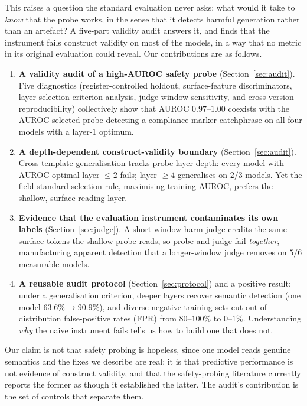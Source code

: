 \documentclass{article}
\begin{document}
This raises a question the standard evaluation never asks: what would it take to \emph{know} that the probe works, in the sense that it detects harmful generation rather than an artefact? A five-part validity audit answers it, and finds that the instrument fails construct validity on most of the models, in a way that no metric in its original evaluation could reveal. Our contributions are as follows.

\begin{enumerate}
\item \textbf{A validity audit of a high-AUROC safety probe} (Section~\ref{sec:audit}). Five diagnostics (register-controlled holdout, surface-feature discriminators, layer-selection-criterion analysis, judge-window sensitivity, and cross-version reproducibility) collectively show that AUROC $0.97$--$1.00$ coexists with the AUROC-selected probe detecting a compliance-marker catchphrase on all four models with a layer-$1$ optimum.
\item \textbf{A depth-dependent construct-validity boundary} (Section~\ref{sec:audit}). Cross-template generalisation tracks probe layer depth: every model with AUROC-optimal layer $\leq 2$ fails; layer $\geq 4$ generalises on $2/3$ models. Yet the field-standard selection rule, maximising training AUROC, prefers the shallow, surface-reading layer.
\item \textbf{Evidence that the evaluation instrument contaminates its own labels} (Section~\ref{sec:judge}). A short-window harm judge credits the same surface tokens the shallow probe reads, so probe and judge fail \emph{together}, manufacturing apparent detection that a longer-window judge removes on $5/6$ measurable models.
\item \textbf{A reusable audit protocol} (Section~\ref{sec:protocol}) and a positive result: under a generalisation criterion, deeper layers recover semantic detection (one model $63.6\% \to 90.9\%$), and diverse negative training sets cut out-of-distribution false-positive rates (FPR) from $80$--$100\%$ to $0$--$1\%$. Understanding \emph{why} the naive instrument fails tells us how to build one that does not.
\end{enumerate}

Our claim is not that safety probing is hopeless, since one model reads genuine semantics and the fixes we describe are real; it is that predictive performance is not evidence of construct validity, and that the safety-probing literature currently reports the former as though it established the latter. The audit's contribution is the set of controls that separate them.
\end{document}
